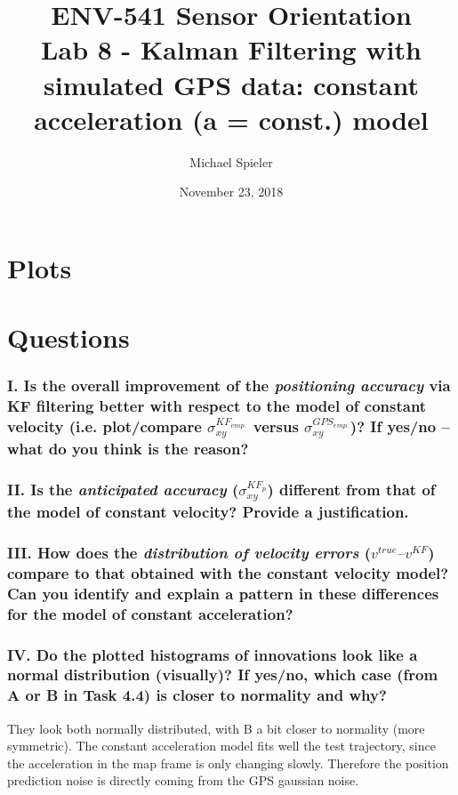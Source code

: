 \documentclass{article}
\title{ENV-541 Sensor Orientation\\Lab 8 - Kalman Filtering with simulated GPS data: constant acceleration (a = const.) model}
\author{Michael Spieler}
\date{November 23, 2018}
\begin{document}
\maketitle

\section*{Plots}

\section*{Questions}


\subsubsection*{I. Is the overall improvement of the \textit{positioning accuracy} via KF filtering better with
respect to the model of constant velocity (i.e. plot/compare $\sigma_{xy}^{KF_{emp.}}$ versus $\sigma_{xy}^{GPS_{emp.}}$)?
If yes/no – what do you think is the reason?}

\subsubsection*{II. Is the \textit{anticipated accuracy} ($\sigma_{xy}^{KF_{p}}$) different from that of the model of constant
velocity? Provide a justification.}

\subsubsection*{III. How does the \textit{distribution of velocity errors} ($v^{true} – v^{KF}$) compare to that obtained
with the constant velocity model? Can you identify and explain a pattern in these
differences for the model of constant acceleration?}

\subsubsection*{IV. Do the plotted histograms of innovations look like a normal distribution (visually)?
If yes/no, which case (from A or B in Task 4.4) is closer to normality and why?}

They look both normally distributed, with B a bit closer to normality (more symmetric).
The constant acceleration model fits well the test trajectory, since the acceleration in the map frame is only changing slowly.
Therefore the position prediction noise is directly coming from the GPS gaussian noise.
\end{document}
